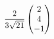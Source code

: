 \documentclass[preview]{standalone}
\begin{document}
\begin{align*}
{2 \over 3 \sqrt{21}} \begin{pmatrix} 2 \\ 4 \\ -1 \end{pmatrix}
\end{align*}
\end{document}
